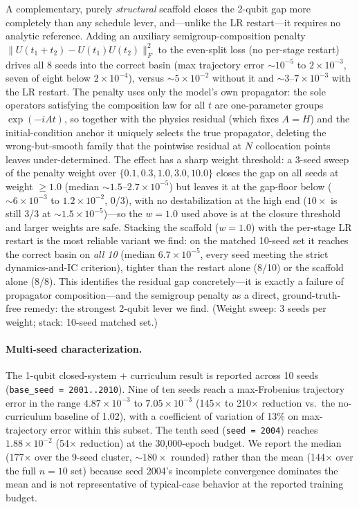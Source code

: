\documentclass[11pt]{article}
\begin{document}
A complementary, purely \emph{structural} scaffold closes the 2-qubit gap more completely than any schedule lever, and---unlike the LR restart---it requires no analytic reference. Adding an auxiliary semigroup-composition penalty $\lVert U(t_1{+}t_2) - U(t_1)U(t_2)\rVert_F^2$ to the even-split loss (no per-stage restart) drives all 8 seeds into the correct basin (max trajectory error $\sim\!10^{-5}$ to $2\times10^{-3}$, seven of eight below $2\times10^{-4}$), versus $\sim\!5\times10^{-2}$ without it and $\sim\!3$--$7\times10^{-3}$ with the LR restart. The penalty uses only the model's own propagator: the sole operators satisfying the composition law for all $t$ are one-parameter groups $\exp(-iAt)$, so together with the physics residual (which fixes $A=H$) and the initial-condition anchor it uniquely selects the true propagator, deleting the wrong-but-smooth family that the pointwise residual at $N$ collocation points leaves under-determined. The effect has a sharp weight threshold: a 3-seed sweep of the penalty weight over $\{0.1, 0.3, 1.0, 3.0, 10.0\}$ closes the gap on all seeds at weight $\geq 1.0$ (median $\sim\!1.5$--$2.7\times10^{-5}$) but leaves it at the gap-floor below ($\sim\!6\times10^{-3}$ to $1.2\times10^{-2}$, 0/3), with no destabilization at the high end ($10\times$ is still 3/3 at $\sim\!1.5\times10^{-5}$)---so the $w=1.0$ used above is at the closure threshold and larger weights are safe. Stacking the scaffold ($w=1.0$) with the per-stage LR restart is the most reliable variant we find: on the matched 10-seed set it reaches the correct basin on \emph{all 10} (median $6.7\times10^{-5}$, every seed meeting the strict dynamics-and-IC criterion), tighter than the restart alone (8/10) or the scaffold alone (8/8). This identifies the residual gap concretely---it is exactly a failure of propagator composition---and the semigroup penalty as a direct, ground-truth-free remedy: the strongest 2-qubit lever we find. (Weight sweep: 3 seeds per weight; stack: 10-seed matched set.)

\paragraph{Multi-seed characterization.}
The 1-qubit closed-system + curriculum result is reported across 10 seeds (\texttt{base\_seed = 2001..2010}). Nine of ten seeds reach a max-Frobenius trajectory error in the range $4.87 \times 10^{-3}$ to $7.05 \times 10^{-3}$ (145$\times$ to 210$\times$ reduction vs.\ the no-curriculum baseline of 1.02), with a coefficient of variation of 13\% on max-trajectory error within this subset. The tenth seed (\texttt{seed = 2004}) reaches $1.88 \times 10^{-2}$ (54$\times$ reduction) at the 30{,}000-epoch budget. We report the median (177$\times$ over the 9-seed cluster, $\sim 180\times$ rounded) rather than the mean (144$\times$ over the full $n=10$ set) because seed 2004's incomplete convergence dominates the mean and is not representative of typical-case behavior at the reported training budget.
\end{document}
